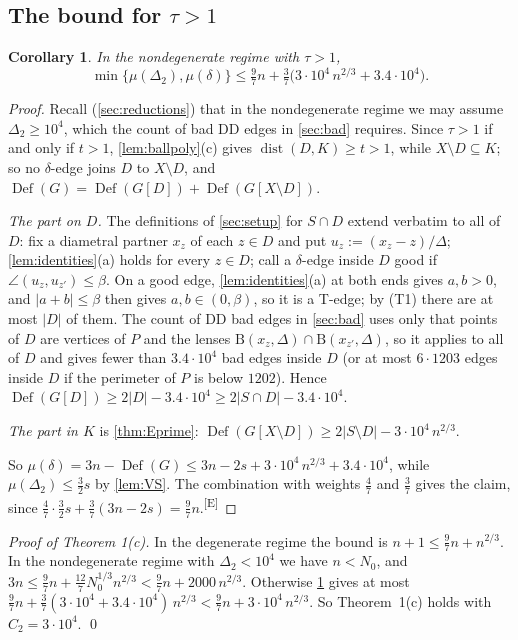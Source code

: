 \documentclass[11pt]{amsart}
\newtheorem{corollary}[theorem]{Corollary}
\theoremstyle{definition}
\theoremstyle{remark}
\newcommand{\Dt}{\Delta_2}
\newcommand{\mult}{\mu}
\newcommand{\dist}{\operatorname{dist}}
\newcommand{\Dd}{\mathrm{B}}      %
\newcommand{\chk}[1]{\textsuperscript{[#1]}}
\begin{document}
\subsection{The bound for \texorpdfstring{$\tau>1$}{tau > 1}}
\begin{corollary}\label{cor:tau1}
In the nondegenerate regime with $\tau>1$,
\[
\min\{\mult(\Dt),\mult(\delta)\}\le\tfrac97n+\tfrac37\bigl(3\cdot10^4\,n^{2/3}+3.4\cdot10^4\bigr).
\]
\end{corollary}
\begin{proof}
Recall (\cref{sec:reductions}) that in the nondegenerate regime we may assume $\Dt\ge10^4$, which the count of bad DD edges in \cref{sec:bad} requires. Since $\tau>1$ if and only if $t>1$, \cref{lem:ballpoly}(c) gives $\dist(D,K)\ge t>1$, while $X\setminus D\subseteq K$; so no $\delta$-edge joins $D$ to $X\setminus D$, and $\operatorname{Def}(G)=\operatorname{Def}(G[D])+\operatorname{Def}(G[X\setminus D])$.

\emph{The part on $D$.} The definitions of \cref{sec:setup} for $S\cap D$ extend verbatim to all of $D$: fix a diametral partner $x_z$ of each $z\in D$ and put $u_z:=(x_z-z)/\Delta$; \cref{lem:identities}(a) holds for every $z\in D$; call a $\delta$-edge inside $D$ good if $\angle(u_z,u_{z'})\le\beta$. On a good edge, \cref{lem:identities}(a) at both ends gives $a,b>0$, and $|a+b|\le\beta$ then gives $a,b\in(0,\beta)$, so it is a T-edge; by (T1) there are at most $|D|$ of them. The count of DD bad edges in \cref{sec:bad} uses only that points of $D$ are vertices of $P$ and the lenses $\Dd(x_z,\Delta)\cap\Dd(x_{z'},\Delta)$, so it applies to all of $D$ and gives fewer than $3.4\cdot10^4$ bad edges inside $D$ (or at most $6\cdot1203$ edges inside $D$ if the perimeter of $P$ is below $1202$). Hence $\operatorname{Def}(G[D])\ge2|D|-3.4\cdot10^4\ge2|S\cap D|-3.4\cdot10^4$.

\emph{The part in $K$} is \cref{thm:Eprime}: $\operatorname{Def}(G[X\setminus D])\ge2|S\setminus D|-3\cdot10^4\,n^{2/3}$.

So $\mult(\delta)=3n-\operatorname{Def}(G)\le3n-2s+3\cdot10^4\,n^{2/3}+3.4\cdot10^4$, while $\mult(\Dt)\le\frac32s$ by \cref{lem:VS}. The combination with weights $\frac47$ and $\frac37$ gives the claim, since $\frac47\cdot\frac32s+\frac37(3n-2s)=\frac97n$.\chk{E}
\end{proof}

\emph{Proof of Theorem 1(c).} In the degenerate regime the bound is $n+1\le\frac97n+n^{2/3}$. In the nondegenerate regime with $\Dt<10^4$ we have $n<N_0$, and $3n\le\frac97n+\frac{12}7N_0^{1/3}n^{2/3}<\frac97n+2000\,n^{2/3}$. Otherwise \cref{cor:tau1} gives at most $\frac97n+\frac37(3\cdot10^4+3.4\cdot10^4)\,n^{2/3}<\frac97n+3\cdot10^4\,n^{2/3}$. So Theorem~1(c) holds with $C_2=3\cdot10^4$. \qed
\end{document}
